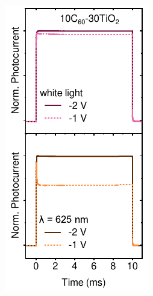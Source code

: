 \begin{figure}[htbp]
\begin{subfigure}{0.245\textwidth}
        \caption{}
        \label{}
    \end{subfigure}
    \hfill
    \begin{subfigure}{0.245\textwidth}
        \centering
        \includegraphics[width=\textwidth]{chapters/transport_layers/images/TPC_10_30.pdf}

\end{subfigure}
\end{figure}
